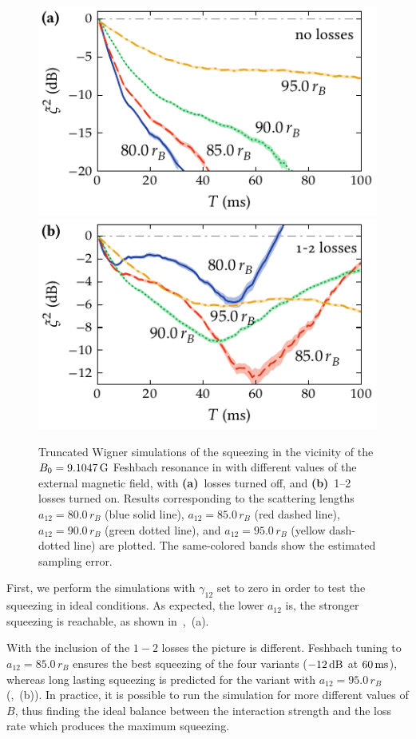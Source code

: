 \begin{figure}
    \centerline{%
    \includegraphics{figures_generated/bec_squeezing/feshbach_squeezing_no_losses.pdf}%
    \includegraphics{figures_generated/bec_squeezing/feshbach_squeezing.pdf}}

    \caption{
    Truncated Wigner simulations of the squeezing in the vicinity of the $B_0 = 9.1047\mbox{\ensuremath{\,\mathrm{G}}}$ Feshbach resonance in \Rb{} with different values of the external magnetic field, with \textbf{(a)}~losses turned off, and \textbf{(b)}~1--2 losses turned on.
    Results corresponding to the scattering lengths $a_{12}=80.0\,r_B$ (blue solid line), $a_{12}=85.0\,r_B$ (red dashed line), $a_{12}=90.0\,r_B$ (green dotted line), and $a_{12}=95.0\,r_B$ (yellow dash-dotted line) are plotted.
    The same-colored bands show the estimated sampling error.}%

    \label{fig:bec-squeezing:feshbach:squeezing}
\end{figure}

First, we perform the simulations with $\gamma_{12}$ set to zero in order to test the squeezing in ideal conditions.
As expected, the lower $a_{12}$ is, the stronger squeezing is reachable, as shown in~,~(a).

With the inclusion of the $1-2$ losses the picture is different.
Feshbach tuning to $a_{12} = 85.0\,r_B$ ensures the best squeezing of the four variants ($-12\mbox{\ensuremath{\,\mathrm{dB}}}$ at $60\mbox{\ensuremath{\,\mathrm{ms}}}$), whereas long lasting squeezing is predicted for the variant with $a_{12} = 95.0\,r_B$ (,~(b)).
In practice, it is possible to run the simulation for more different values of $B$, thus finding the ideal balance between the interaction strength and the loss rate which produces the maximum squeezing.
